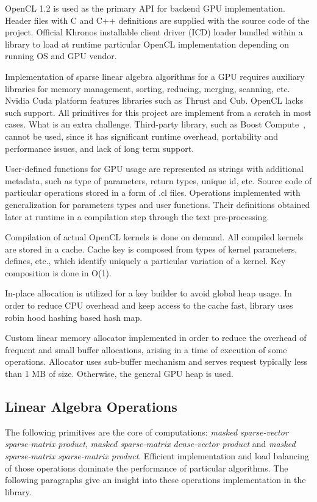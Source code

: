 OpenCL 1.2 is used as the primary API for backend GPU implementation. Header files with C and C++ definitions are supplied with the source code of the project. Official Khronos installable client driver (ICD) loader bundled within a library to load at runtime particular OpenCL implementation depending on running OS and GPU vendor. 

Implementation of sparse linear algebra algorithms for a GPU requires auxiliary libraries for memory management, sorting, reducing, merging, scanning, etc. Nvidia Cuda platform features libraries such as Thrust and Cub. OpenCL lacks such support. All primitives for this project are implement from a scratch in most cases. What is an extra challenge. Third-party library, such as Boost Compute~\cite{article:boost_compute}, cannot be used, since it has significant runtime overhead, portability and performance issues, and lack of long term support.

User-defined functions for GPU usage are represented as strings with additional metadata, such as type of parameters, return types, unique id, etc. Source code of particular operations stored in a form of .cl files. Operations implemented with generalization for parameters types and user functions. Their definitions obtained later at runtime in a compilation step through the text pre-processing. 

Compilation of actual OpenCL kernels is done on demand. All compiled kernels are stored in a cache. Cache key is composed from types of kernel parameters, defines, etc., which identify uniquely a particular variation of a kernel. Key composition is done in O(1). 

In-place allocation is utilized for a key builder to avoid global heap usage. In order to reduce CPU overhead and keep access to the cache fast, library uses robin hood hashing based hash map. 

Custom linear memory allocator implemented in order to reduce the overhead of frequent and small buffer allocations, arising in a time of execution of some operations. Allocator uses sub-buffer mechanism and serves request typically less than 1 MB of size. Otherwise, the general GPU heap is used.

\subsection{Linear Algebra Operations}

The following primitives are the core of computations: \textit{masked sparse-vector sparse-matrix product}, \textit{masked sparse-matrix dense-vector product} and \textit{masked sparse-matrix sparse-matrix product}. Efficient implementation and load balancing of those operations dominate the performance of particular algorithms. The following paragraphs give an insight into these operations implementation in the library.\\

